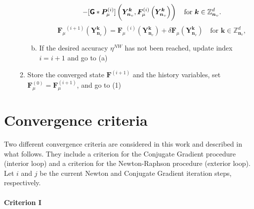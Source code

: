 \begin{framedbox}[htb]
\begin{center}
\begin{minipage}{0.9\textwidth}
\begin{enumerate}[(i)]
\begin{enumerate}[(1)]
\begin{enumerate}[(a)]
\begin{itemize}
\begin{multline*}
      -[\boldsymbol{\mathsf{G}}* \bm{P}_\mu^{(i)}]\left(\bm Y_{\bm n_v}^{\bm  k}, \bm F_\mu^{(i)}\left(\bm Y_{\bm n_v}^{\bm  k}\right)\right)\quad\text{for \(\bm k\in \mathbb Z^d_{\bm n_v}\)}.
      \end{multline*}
      \begin{equation*}
      {\bm{F}_\mu}^{(i+1)}\left(\bm Y_{\bm n_v}^{\bm  k}\right)={\bm{F}_\mu}^{(i)}\left(\bm Y_{\bm n_v}^{\bm  k}\right)+\delta {\bm{F}_\mu}\left(\bm Y_{\bm n_v}^{\bm  k}\right)\quad \text{for \(\bm k\in \mathbb Z^d_{\bm n_v}\)},
      \end{equation*}
    \end{itemize}
    \item If the desired accuracy \(\eta^{NW}\) has not been reached, update index \(i=i+1\) and go to (a)
  \end{enumerate}
  \item Store the converged state \(\bm F^{(i+1)}\) and the history variables, set \(\bm F^{(0)}_\mu=\bm F^{(i+1)}_\mu\), and go to (1)
\end{enumerate}
\end{enumerate}
\end{minipage}
\end{center}
\end{framedbox}

\section{Convergence criteria} \label{sec:criteria}

Two different convergence criteria are considered in this work and described in what follows.
They include a criterion for the Conjugate Gradient procedure (interior loop) and a criterion for the Newton-Raphson procedure (exterior loop).
Let \(i\) and \(j\) be the current Newton and Conjugate Gradient iteration steps, respectively.

\paragraph{Criterion I}

